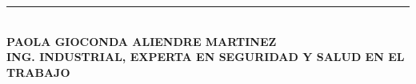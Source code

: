 \begin{center}
    \vspace{1.5cm}
    \hspace*{0pt}
    \textcolor{gray}{\rule{180pt}{0.1pt}}
    \vspace{-0.2cm}\\
    \MakeUppercase{\bf{ Paola Gioconda Aliendre Martinez }}\\[-0.2cm]
    \MakeUppercase{\bf{ Ing. Industrial, experta en Seguridad y Salud en el Trabajo }} 
\end{center}